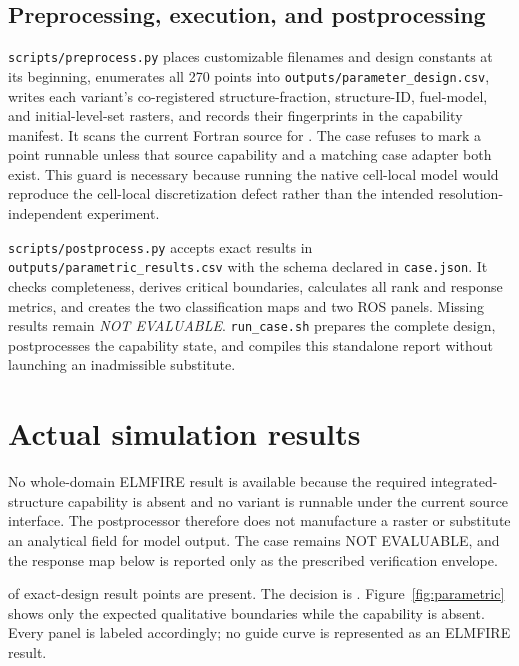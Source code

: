 \subsection{Preprocessing, execution, and postprocessing}

\texttt{scripts/preprocess.py} places customizable filenames and design
constants at its beginning, enumerates all 270 points into
\texttt{outputs/parameter\_design.csv}, writes each variant's co-registered
structure-fraction, structure-ID, fuel-model, and initial-level-set rasters,
and records their fingerprints in the capability manifest. It scans the current Fortran source for
. The case refuses to mark a
point runnable unless that source capability and a matching case adapter both
exist. This guard is necessary because running the native cell-local model
would reproduce the cell-local discretization defect rather than the intended
resolution-independent experiment.

\texttt{scripts/postprocess.py} accepts exact results in
\texttt{outputs/parametric\_results.csv} with the schema declared in
\texttt{case.json}. It checks completeness, derives critical boundaries,
calculates all rank and response metrics, and creates the two classification
maps and two ROS panels. Missing results remain \emph{NOT EVALUABLE}.
\texttt{run\_case.sh} prepares the complete design, postprocesses the
capability state, and compiles this standalone report without launching an
inadmissible substitute.

\section{Actual simulation results}

No whole-domain ELMFIRE result is available because the required integrated-structure
capability is absent and no variant is runnable under the current source interface.
The postprocessor therefore does not manufacture a raster or substitute an analytical
field for model output.  The case remains NOT EVALUABLE, and the response map below is
reported only as the prescribed verification envelope.


\CompletedVariantCount{} of \RequestedVariantCount{} exact-design result
points are present. The decision is \textbf{\OverallStatus}. Figure~\ref{fig:parametric}
shows only the expected qualitative boundaries while the capability is absent.
Every panel is labeled accordingly; no guide curve is represented as an
ELMFIRE result.

